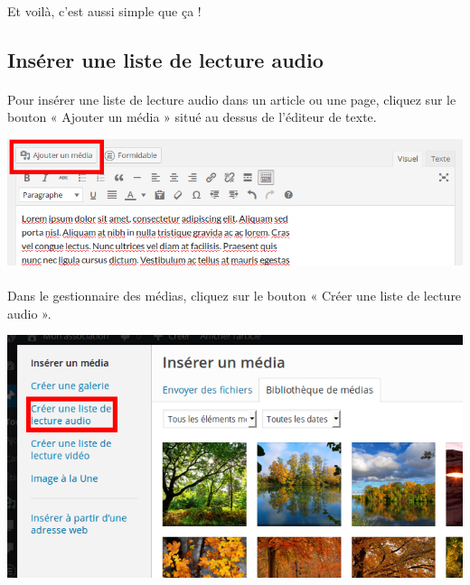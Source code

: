 \documentclass[10pt,a4paper]{article}
\begin{document}
\paragraph{}Et voilà, c'est aussi simple que ça !
\newpage
\subsection{Insérer une liste de lecture audio}
\paragraph{}Pour insérer une liste de lecture audio dans un article ou une page, cliquez sur le bouton « Ajouter un média » situé au dessus de l'éditeur de texte.
\begin{center}
\includegraphics[scale=0.3]{img/0102.png}
\end{center}
\paragraph{}Dans le gestionnaire des médias, cliquez sur le bouton « Créer une liste de lecture audio ».
\begin{center}
\includegraphics[scale=0.3]{img/0122.png}
\end{center}
\end{document}
